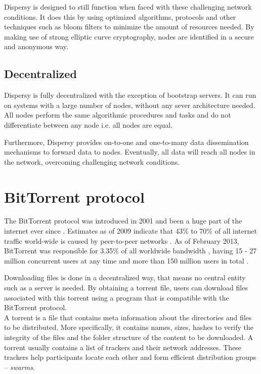 Dispersy is designed to still function when faced with these challenging network conditions.
It does this by using optimized algorithms, protocols and other techniques such as bloom filters to minimize the amount of resources needed.
By making use of strong elliptic curve cryptography, nodes are identified in a secure and anonymous way.

\subsection{Decentralized}
Dispersy is fully decentralized with the exception of bootstrap servers.
It can run on systems with a large number of nodes, without any sever architecture needed.
All nodes perform the same algorithmic procedures and tasks and do not differentiate between any node i.e. all nodes are equal.

Furthermore, Dispersy provides on-to-one and one-to-many data dissemination mechanisms to forward data to nodes.
Eventually, all data will reach all nodes in the network, overcoming challenging network conditions.

\section{BitTorrent protocol}
The BitTorrent protocol was introduced in 2001 and been a huge part of the internet ever since \cite{Cohen2001BitTorrent}.
Estimates as of 2009 indicate that 43\% to 70\% of all internet traffic world-wide is caused by peer-to-peer networks \cite{schulze2009internet}.
As of February 2013, BitTorrent was responsible for 3.35\% of all worldwide bandwidth \cite{palo2013application}, having 15 - 27 million concurrent users at any time \cite{wang2013measuring} and more than 150 million users in total \cite{reuters2012bittorrent}.

Downloading files is done in a decentralized way, that means no central entity such as a server is needed.
By obtaining a torrent file, users can download files associated with this torrent using a program that is compatible with the BitTorrent protocol.\\

A torrent is a file that contains meta information about the directories and files to be distributed.
More specifically, it contains names, sizes, hashes to verify the integrity of the files and the folder structure of the content to be downloaded.
A torrent usually contains a list of trackers and their network addresses.
These trackers help participants locate each other and form efficient distribution groups -- \emph{swarms}.
 

